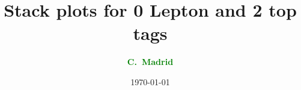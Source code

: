 \documentclass[10pt,xcolor=svgnames,fleqn,aspectratio=169]{beamer}
\title{Stack plots for 0 Lepton and 2 top tags }
\author{\textcolor{Green}{\bf C.~Madrid\inst{1}}}
\institute{\inst{1} Baylor}
\date{\today}
\begin{document}
\begin{frame}[plain]
\maketitle
\end{frame}




\end{document}
